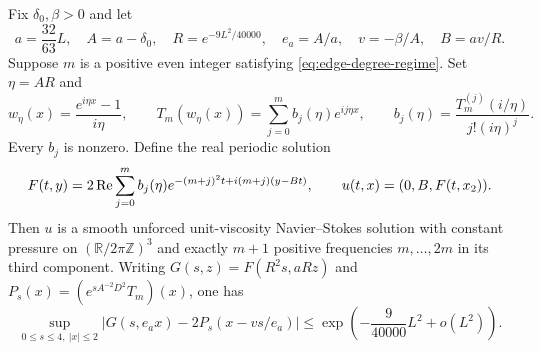 \begin{proposition}\label{prop:dynamic-confluence}
Fix $\delta_0,\beta>0$ and let
\begin{equation}\label{eq:parabolic-frozen-parameters}
 a=\frac{32}{63}L,\quad A=a-\delta_0,\quad
 R=e^{-9L^2/40000},\quad e_a=A/a,\quad
 v=-\beta/A,\quad B=av/R.
\end{equation}
Suppose $m$ is a positive even integer satisfying
\eqref{eq:edge-degree-regime}.  Set $\eta=AR$ and
\begin{equation}\label{eq:parabolic-fourier-coefficients}
 w_\eta(x)=\frac{e^{i\eta x}-1}{i\eta},\qquad
 T_m(w_\eta(x))=\sum_{j=0}^m b_j(\eta)e^{ij\eta x},\qquad
 b_j(\eta)=\frac{T_m^{(j)}(i/\eta)}{j!(i\eta)^j}.
\end{equation}
Every $b_j$ is nonzero.  Define the real periodic solution
\begin{equation}\label{eq:parabolic-exact-shear}
 F(t,y)=2\operatorname{Re}\sum_{j=0}^m b_j(\eta)
 e^{-(m+j)^2t+i(m+j)(y-Bt)},\qquad
 u(t,x)=(0,B,F(t,x_2)).
\end{equation}
Then $u$ is a smooth unforced unit-viscosity Navier--Stokes solution with constant
pressure on $(\mathbb R/2\pi\mathbb Z)^3$ and exactly $m+1$ positive
frequencies $m,\ldots,2m$ in its third component.
Writing $G(s,z)=F(R^2s,aRz)$ and
$P_s(x)=(e^{sA^{-2}D^2}T_m)(x)$, one has
\begin{equation}\label{eq:parabolic-uniform-transfer}
 \sup_{0\le s\le4,\ |x|\le2}
 \left|G(s,e_ax)-2P_s(x-vs/e_a)\right|
 \le \exp\!\left(-\frac9{40000}L^2+o(L^2)\right).
\end{equation}
\end{proposition}


